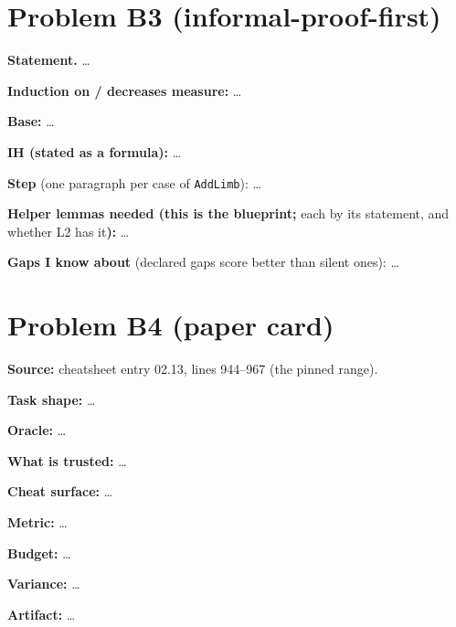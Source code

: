 \documentclass[11pt]{article}
\begin{document}
\section*{Problem B3 (informal-proof-first)}\label{ans:B3}
\begin{answer}
\textbf{Statement.} \dots

\textbf{Induction on / decreases measure:} \dots

\textbf{Base:} \dots

\textbf{IH (stated as a formula):} \dots

\textbf{Step} (one paragraph per case of \texttt{AddLimb}): \dots

\textbf{Helper lemmas needed (this is the blueprint;} each by its statement,
and whether L2 has it\textbf{):} \dots

\textbf{Gaps I know about} (declared gaps score better than silent ones): \dots
\end{answer}

\section*{Problem B4 (paper card)}\label{ans:B4}
\begin{answer}
\textbf{Source:} cheatsheet entry 02.13, lines 944--967 (the pinned range).

\textbf{Task shape:} \dots

\textbf{Oracle:} \dots

\textbf{What is trusted:} \dots

\textbf{Cheat surface:} \dots

\textbf{Metric:} \dots

\textbf{Budget:} \dots

\textbf{Variance:} \dots

\textbf{Artifact:} \dots
\end{answer}
\end{document}
